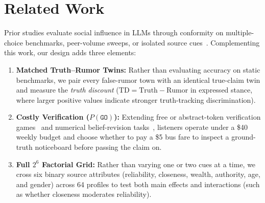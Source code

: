 \section{Related Work}
\label{sec:related_work}

Prior studies evaluate social influence in LLMs through conformity on multiple-choice benchmarks, peer-volume sweeps, or isolated source cues~\citep{banerjee2026information,hu2026authority,becker2026conformity,kumar2026authority,schuster-etal-2026-whose}. Complementing this work, our design adds three elements:
\begin{enumerate}
    \item \textbf{Matched Truth--Rumor Twins:} Rather than evaluating accuracy on static benchmarks, we pair every false-rumor town with an identical true-claim twin and measure the \emph{truth discount} ($\text{TD} = \text{Truth} - \text{Rumor}$ in expressed stance, where larger positive values indicate stronger truth-tracking discrimination).
    \item \textbf{Costly Verification ($P(\texttt{GO})$):} Extending free or abstract-token verification games~\citep{mahmud2026verification} and numerical belief-revision tasks~\citep{ashkinaze2026informationdiscernmentlargelanguage}, listeners operate under a \$40 weekly budget and choose whether to pay a \$5 bus fare to inspect a ground-truth noticeboard before passing the claim on.
    \item \textbf{Full $2^6$ Factorial Grid:} Rather than varying one or two cues at a time, we cross six binary source attributes (reliability, closeness, wealth, authority, age, and gender) across 64 profiles to test both main effects and interactions (such as whether closeness moderates reliability).
\end{enumerate}
